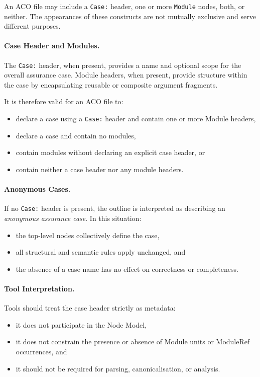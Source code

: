 \documentclass[11pt,twoside,a4paper]{article}
\begin{document}
An ACO file may include a \texttt{Case:} header, one or more \texttt{Module} nodes, both, or neither.
The appearances of these constructs are not mutually exclusive and serve different purposes.

\paragraph{Case Header and Modules.}
The \texttt{Case:} header, when present, provides a name and optional scope for the overall
assurance case. Module headers, when present, provide structure within the case by encapsulating
reusable or composite argument fragments.

It is therefore valid for an ACO file to:
\begin{itemize}[leftmargin=2em]
  \item declare a case using a \texttt{Case:} header and contain one or more Module headers,
  \item declare a case and contain no modules,
  \item contain modules without declaring an explicit case header, or
  \item contain neither a case header nor any module headers.
\end{itemize}

\paragraph{Anonymous Cases.}
If no \texttt{Case:} header is present, the outline is interpreted as describing an
\emph{anonymous assurance case}. In this situation:
\begin{itemize}[leftmargin=2em]
  \item the top-level nodes collectively define the case,
  \item all structural and semantic rules apply unchanged, and
  \item the absence of a case name has no effect on correctness or completeness.
\end{itemize}

\paragraph{Tool Interpretation.}
Tools should treat the case header strictly as metadata:
\begin{itemize}[leftmargin=2em]
  \item it does not participate in the Node Model,
  \item it does not constrain the presence or absence of Module units or ModuleRef occurrences, and
  \item it should not be required for parsing, canonicalisation, or analysis.
\end{itemize}
\end{document}
